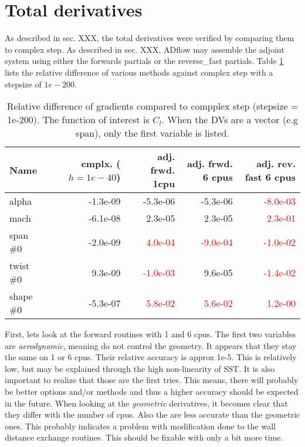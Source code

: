 \section{Total derivatives}
As described in sec. XXX, the total derivatives were verified by comparing them
to complex step. As described in sec. XXX, ADflow may assemble the adjoint
system using either the forwards partials or the reverse\_fast partials. Table
\ref{tab:total_derivs} lists the relative difference of various methods
against complex step with a stepsize of $1e-200$.

\begin{table}[H]
    \centering
    \begin{tabular}{l r r r r}
        \toprule
        Name        & cmplx. ($h=1e-40$)   & adj. frwd. 1cpu           & 
            adj. frwd. 6 cpus         & adj. rev. fast 6 cpus    \\
        \toprule
        alpha       & -1.3e-09             & -5.3e-06                  & 
            -5.3e-06                  & \textcolor{red}{-8.0e-03} \\
        mach        & -6.1e-08             &  2.3e-05                  &  
            2.3e-05                  & \textcolor{red}{ 2.3e-01} \\
        \midrule
        span \#0    & -2.0e-09             &\textcolor{red}{ 4.0e-04}  &
            \textcolor{red}{-9.0e-04}  & \textcolor{red}{-1.0e-02} \\        
        twist \#0   &  9.3e-09             &\textcolor{red}{-1.0e-03}  &
            9.6e-05                    & \textcolor{red}{-1.4e-02} \\        
        shape \#0   & -5.3e-07             &\textcolor{red}{ 5.8e-02}  &
            \textcolor{red}{ 5.6e-02}  & \textcolor{red}{ 1.2e-00} \\         
        \bottomrule
    \end{tabular}
    \caption{Relative difference of gradients compared to compplex step
    (stepsize = 1e-200). The function of interest is $C_l$. When the DVs are a
    vector (e.g span), only the first variable is listed.}
    \label{tab:total_derivs}
\end{table}

\noindent First, lets look at the forward routines with 1 and 6 cpus. The first
two variables are \textit{aerodynamic}, meaning do not control the geometry. It
appears that they stay the same on 1 or 6 cpus. Their relative accuracy is
approx 1e-5. This is relatively low, but may be explained through the high
non-linearity of SST. It is also important to realize that those are the first
tries. This means, there will probably be better options and/or methods and
thus a higher accuracy should be expected in the future. When looking at the
\textit{geometric} derivatives, it becomes clear that they differ with the
number of cpus. Also the are less accurate than the geometric ones. This
probably indicates a problem with modification done to the wall distance
exchange routines. This should be fixable with only a bit more time.

